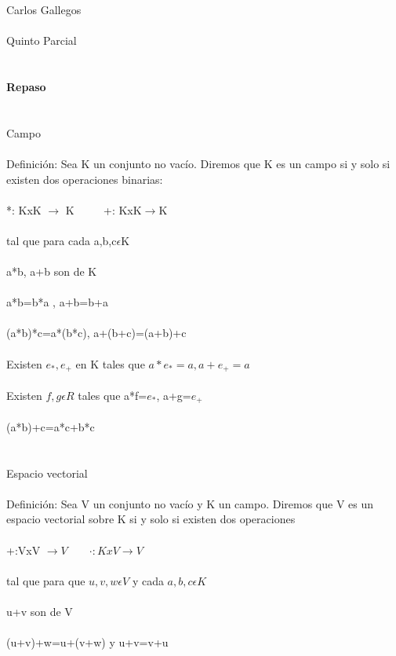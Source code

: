 \documentclass[a4paper,10pt]{article}
\title{}
\author{}
\date{}
\begin{document}
\maketitle
Carlos Gallegos\\\\
Quinto Parcial\\\\\\
\textbf{Repaso}\\\\\\
Campo\\\\
Definición: Sea K un conjunto no vacío. Diremos que K es un campo si y solo si existen dos operaciones binarias:\\\\
*: KxK $\rightarrow$ K $\quad\quad$ +: KxK$\rightarrow$K\\\\
tal que para cada a,b,c$\epsilon$K\\\\
a*b, a+b son de K\\\\
a*b=b*a	, a+b=b+a\\\\
(a*b)*c=a*(b*c), a+(b+c)=(a+b)+c\\\\
Existen $e_* , e_+ $ en K tales que $a*e_* = a, a+e_+ =a$\\\\
Existen $f, g \epsilon R$ tales que a*f=$e_*$, a+g=$e_+$\\\\
(a*b)+c=a*c+b*c\\\\\\
Espacio vectorial\\\\
Definición: Sea V un conjunto no vacío y K un campo. Diremos que V es un espacio vectorial sobre K si y solo si existen dos operaciones\\\\
+:VxV $\rightarrow V\quad\quad  \cdot :KxV \rightarrow V$\\\\
tal que para que $u,v,w \epsilon V$ y cada $a,b,c\epsilon K$\\\\
u+v son de V\\\\
(u+v)+w=u+(v+w) y u+v=v+u\\\\
\end{document}
